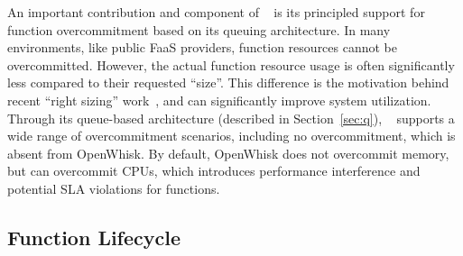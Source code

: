 An important contribution and component of \sysname~ is its principled support for function overcommitment based on its queuing architecture.
In many environments, like public FaaS providers, function resources cannot be overcommitted. 
However, the actual function resource usage is often significantly less compared to their requested ``size''.
This difference is the motivation behind recent ``right sizing'' work~\cite{akhtar_cose_2020, guo_decomposing_2022, tian_owl_2022, eismann2021sizeless, kotni2021faastlane}, and can significantly improve system utilization.
Through its queue-based architecture (described in Section~\ref{sec:q}), \sysname~ supports a wide range of overcommitment scenarios, including no overcommitment, which is absent from OpenWhisk.
By default, OpenWhisk does not overcommit memory, but can  overcommit CPUs, which introduces performance interference and potential SLA violations for functions. 





\subsection{Function Lifecycle}
\label{sec:design:lifecycle}

